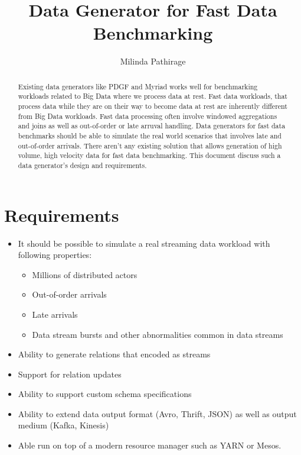 \documentclass{thesis}
\title{Data Generator for Fast Data Benchmarking}
\author{Milinda Pathirage}
\begin{document}
\maketitle


\begin{abstract}
Existing data generators like PDGF and Myriad works well for benchmarking workloads related to Big Data where we process data at rest. Fast data workloads, that process data while they are on their way to become data at rest are inherently different from Big Data workloads. Fast data processing often involve windowed aggregations and joins as well as out-of-order or late arruval handling. Data generators for fast data benchmarks should be able to simulate the real world scenarios that involves late and out-of-order arrivals. There aren't any existing solution that allows generation of high volume, high velocity data for fast data benchmarking. This document discuss such a data generator's design and requirements.
\end{abstract}

\section{Requirements}

\begin{itemize}
	\item It should be possible to simulate a real streaming data workload with following properties:
	\begin{itemize}
	 	\item Millions of distributed actors
	 	\item Out-of-order arrivals
	 	\item Late arrivals
	 	\item Data stream bursts and other abnormalities common in data streams
	 \end{itemize} 
	\item Ability to generate relations that encoded as streams
	\item Support for relation updates
	\item Ability to support custom schema specifications
	\item Ability to extend data output format (Avro, Thrift, JSON) as well as output medium (Kafka, Kinesis)
	\item Able run on top of a modern resource manager such as YARN or Mesos.
\end{itemize}






\end{document}
